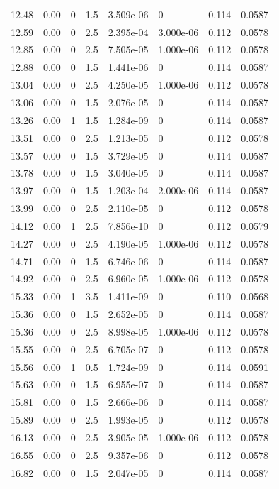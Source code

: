 \documentclass[preview]{standalone}
\begin{document}
{{{\begin{tabular}{L{1.2cm}C{1.2cm} C{0.3cm}C{0.5cm} C{1.4cm}C{1.4cm} C{1.4cm}C{1.4cm}}
  12.48  &  0.00  & 0     & 1.5 &  3.509e-06  & 0  & 0.114 &  0.0587   \\ 
  12.59  &  0.00  & 0     & 2.5 &  2.395e-04  & 3.000e-06  & 0.112 &  0.0578   \\ 
  12.85  &  0.00  & 0     & 2.5 &  7.505e-05  & 1.000e-06  & 0.112 &  0.0578   \\ 
  12.88  &  0.00  & 0     & 1.5 &  1.441e-06  & 0  & 0.114 &  0.0587   \\ 
  13.04  &  0.00  & 0     & 2.5 &  4.250e-05  & 1.000e-06  & 0.112 &  0.0578   \\ 
  13.06  &  0.00  & 0     & 1.5 &  2.076e-05  & 0  & 0.114 &  0.0587   \\ 
  13.26  &  0.00  & 1     & 1.5 &  1.284e-09  & 0  & 0.114 &  0.0587   \\ 
  13.51  &  0.00  & 0     & 2.5 &  1.213e-05  & 0  & 0.112 &  0.0578   \\ 
  13.57  &  0.00  & 0     & 1.5 &  3.729e-05  & 0  & 0.114 &  0.0587   \\ 
  13.78  &  0.00  & 0     & 1.5 &  3.040e-05  & 0  & 0.114 &  0.0587   \\ 
  13.97  &  0.00  & 0     & 1.5 &  1.203e-04  & 2.000e-06  & 0.114 &  0.0587   \\ 
  13.99  &  0.00  & 0     & 2.5 &  2.110e-05  & 0  & 0.112 &  0.0578   \\ 
  14.12  &  0.00  & 1     & 2.5 &  7.856e-10  & 0  & 0.112 &  0.0579   \\ 
  14.27  &  0.00  & 0     & 2.5 &  4.190e-05  & 1.000e-06  & 0.112 &  0.0578   \\ 
  14.71  &  0.00  & 0     & 1.5 &  6.746e-06  & 0  & 0.114 &  0.0587   \\ 
  14.92  &  0.00  & 0     & 2.5 &  6.960e-05  & 1.000e-06  & 0.112 &  0.0578   \\ 
  15.33  &  0.00  & 1     & 3.5 &  1.411e-09  & 0  & 0.110 &  0.0568   \\ 
  15.36  &  0.00  & 0     & 1.5 &  2.652e-05  & 0  & 0.114 &  0.0587   \\ 
  15.36  &  0.00  & 0     & 2.5 &  8.998e-05  & 1.000e-06  & 0.112 &  0.0578   \\ 
  15.55  &  0.00  & 0     & 2.5 &  6.705e-07  & 0  & 0.112 &  0.0578   \\ 
  15.56  &  0.00  & 1     & 0.5 &  1.724e-09  & 0  & 0.114 &  0.0591   \\ 
  15.63  &  0.00  & 0     & 1.5 &  6.955e-07  & 0  & 0.114 &  0.0587   \\ 
  15.81  &  0.00  & 0     & 1.5 &  2.666e-06  & 0  & 0.114 &  0.0587   \\ 
  15.89  &  0.00  & 0     & 2.5 &  1.993e-05  & 0  & 0.112 &  0.0578   \\ 
  16.13  &  0.00  & 0     & 2.5 &  3.905e-05  & 1.000e-06  & 0.112 &  0.0578   \\ 
  16.55  &  0.00  & 0     & 2.5 &  9.357e-06  & 0  & 0.112 &  0.0578   \\ 
  16.82  &  0.00  & 0     & 1.5 &  2.047e-05  & 0  & 0.114 &  0.0587   \\ 
\hline 
\end{tabular} 

}}}
\end{document}

